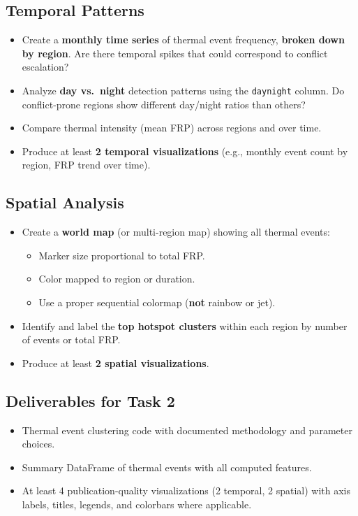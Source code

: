 \documentclass[11pt]{article}
\begin{document}
\subsection{Temporal Patterns}
\begin{itemize}
  \item Create a \textbf{monthly time series} of thermal event frequency, \textbf{broken down by region}. Are there temporal spikes that could correspond to conflict escalation?
  \item Analyze \textbf{day vs.\ night} detection patterns using the \texttt{daynight} column. Do conflict-prone regions show different day/night ratios than others?
  \item Compare thermal intensity (mean FRP) across regions and over time.
  \item Produce at least \textbf{2 temporal visualizations} (e.g., monthly event count by region, FRP trend over time).
\end{itemize}

\subsection{Spatial Analysis}
\begin{itemize}
  \item Create a \textbf{world map} (or multi-region map) showing all thermal events:
  \begin{itemize}
    \item Marker size proportional to total FRP.
    \item Color mapped to region or duration.
    \item Use a proper sequential colormap (\textbf{not} rainbow or jet).
  \end{itemize}
  \item Identify and label the \textbf{top hotspot clusters} within each region by number of events or total FRP.
  \item Produce at least \textbf{2 spatial visualizations}.
\end{itemize}

\subsection{Deliverables for Task 2}
\begin{itemize}
  \item Thermal event clustering code with documented methodology and parameter choices.
  \item Summary DataFrame of thermal events with all computed features.
  \item At least 4 publication-quality visualizations (2 temporal, 2 spatial) with axis labels, titles, legends, and colorbars where applicable.
\end{itemize}
\end{document}
